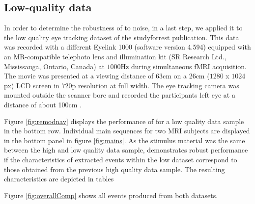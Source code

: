 \subsection*{Low-quality data}\label{ana_3}

In order to determine the robustness of \remodnav to noise, in a last step, we applied it to the low quality eye tracking dataset of the studyforrest publication. This data was recorded with a different Eyelink 1000 (software version 4.594) equipped with an MR-compatible telephoto lens and illumination kit (SR Research Ltd., Mississauga, Ontario, Canada) at $1000$Hz during simultaneous fMRI acquisition. The movie was presented at a viewing distance of $63$cm on a 26cm ($1280$ x $1024$px) LCD screen in 720p resolution at full width. The eye tracking camera was mounted outside the scanner bore and recorded the participants left eye at a distance of about 100cm \citep{Hanke2016}. 

Figure \ref{fig:remodnav} displays the performance of \remodnav for a low quality data sample in the bottom row. Individual main sequences for two MRI subjects are displayed in the bottom panel in figure \ref{fig:mains}. As the stimulus material was the same between the high and low quality data sample, \remodnav demonstrates robust performance if the characteristics of extracted events within the low dataset correspond to those obtained from the previous high quality data sample. The resulting characteristics are depicted in tables  

Figure \ref{fig:overallComp} shows all events produced from both datasets.


